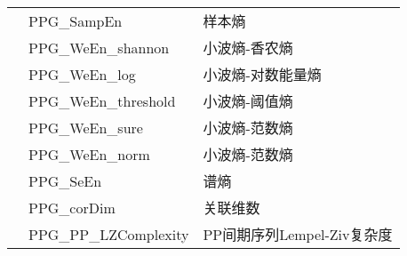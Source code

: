 \begin{table}[t]
{\begin{tabular}{lll}
                                                                  & {PPG\_SampEn}             & {样本熵}                                 \\
                                                                  & {PPG\_WeEn\_shannon}    & {小波熵-香农熵}                          \\
                                                                  & {PPG\_WeEn\_log}        & {小波熵-对数能量熵}                      \\
                                                                  & {PPG\_WeEn\_threshold}  & {小波熵-阈值熵}                          \\
                                                                  & {PPG\_WeEn\_sure}       & {小波熵-范数熵}                          \\
                                                                  & {PPG\_WeEn\_norm}       & {小波熵-范数熵}                          \\
                                                                  & {PPG\_SeEn}             & {谱熵}                                   \\
                                                                  & {PPG\_corDim}           & {关联维数}                               \\
                                                                  & {PPG\_PP\_LZComplexity} & {PP间期序列Lempel-Ziv复杂度}             \\ \bottomrule
        \end{tabular}}
\end{table}
\clearpage
\makeatletter
\setlength{\@fptop}{5pt}
\makeatother
